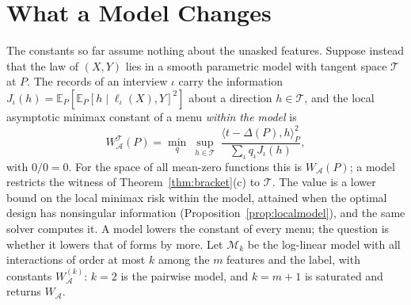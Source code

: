 \documentclass{article}
\newcommand{\E}{\mathbb{E}}
\newcommand{\A}{\mathcal A}
\begin{document}
\section{What a Model Changes}\label{sec:model}
The constants so far assume nothing about the unasked features. Suppose instead that the law of $(X,Y)$ lies in a smooth parametric model with tangent space $\mathcal T$ at $P$. The records of an interview $\iota$ carry the information $J_\iota(h)=\E_P[\E_P[h\mid\ell_\iota(X),Y]^2]$ about a direction $h\in\mathcal T$, and the local asymptotic minimax constant of a menu \emph{within the model} is
\begin{equation}
 W^{\mathcal T}_\A(P)=\min_q\ \sup_{h\in\mathcal T}\ \frac{\langle t-\Delta(P),h\rangle_P^2}{\sum_\iota q_\iota J_\iota(h)},\label{eq:mainWT}
\end{equation}
with $0/0=0$. For the space of all mean-zero functions this is $W_\A(P)$; a model restricts the witness of Theorem~\ref{thm:bracket}(c) to $\mathcal T$. The value is a lower bound on the local minimax risk within the model, attained when the optimal design has nonsingular information (Proposition~\ref{prop:localmodel}), and the same solver computes it. A model lowers the constant of every menu; the question is whether it lowers that of forms by more. Let $\mathcal M_k$ be the log-linear model with all interactions of order at most $k$ among the $m$ features and the label, with constants $W^{(k)}_\A$: $k=2$ is the pairwise model, and $k=m+1$ is saturated and returns $W_\A$.
\end{document}

